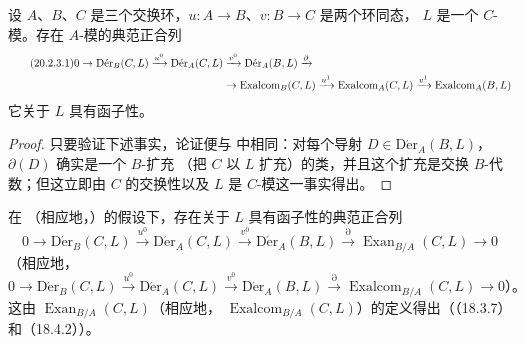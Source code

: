 \begin{corollary}[20.2.3]
\label{0.20.2.3-fr}
设 $A$、$B$、$C$ 是三个交换环，$u:A\to B$、$v:B\to C$ 是两个环同态，
$L$ 是一个 $C$-模。存在 $A$-模的典范正合列
\begin{align}
\tag{20.2.3.1}
\label{0.20.2.3.1-fr}
  0\to\operatorname{D\acute{e}r}_B(C,L)\xrightarrow{u^0}
  \operatorname{D\acute{e}r}_A(C,L)&\xrightarrow{v^0}
  \operatorname{D\acute{e}r}_A(B,L)\xrightarrow{\partial} \\
  &\to\operatorname{Exalcom}_B(C,L)\xrightarrow{u^1}
  \operatorname{Exalcom}_A(C,L)\xrightarrow{v^1}
  \operatorname{Exalcom}_A(B,L) \notag
\end{align}
它关于 $L$ 具有函子性。
\end{corollary}

\begin{proof}
只要验证下述事实，论证便与  中相同：对每个导射
$D\in\operatorname{D\acute{e}r}_A(B,L)$，$\partial(D)$ 确实是一个 $B$-扩充
（把 $C$ 以 $L$ 扩充）的类，并且这个扩充是交换 $B$-代数；但这立即由 $C$
的交换性以及 $L$ 是 $C$-模这一事实得出。
\end{proof}

\begin{corollary}[20.2.4]
\label{0.20.2.4-fr}
在 （相应地，）的假设下，存在关于 $L$
具有函子性的典范正合列
\begin{equation}
\tag{20.2.4.1}
\label{0.20.2.4.1-fr}
  0\to\operatorname{D\acute{e}r}_B(C,L)\xrightarrow{u^0}
  \operatorname{D\acute{e}r}_A(C,L)\xrightarrow{v^0}
  \operatorname{D\acute{e}r}_A(B,L)\xrightarrow{\partial}
  \operatorname{Exan}_{B/A}(C,L)\to0
\end{equation}
（相应地，
\begin{equation}
\tag{20.2.4.2}
\label{0.20.2.4.2-fr}
  0\to\operatorname{D\acute{e}r}_B(C,L)\xrightarrow{u^0}
  \operatorname{D\acute{e}r}_A(C,L)\xrightarrow{v^0}
  \operatorname{D\acute{e}r}_A(B,L)\xrightarrow{\partial}
  \operatorname{Exalcom}_{B/A}(C,L)\to0\text{）。}
\end{equation}
这由 $\operatorname{Exan}_{B/A}(C,L)$（相应地，
$\operatorname{Exalcom}_{B/A}(C,L)$）的定义得出（（18.3.7）和（18.4.2））。
\end{corollary}

